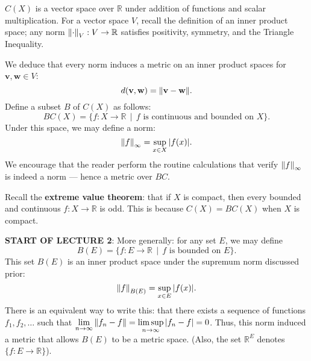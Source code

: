 \documentclass[11pt]{article}
\renewcommand{\vec}[1]{\mathbf{#1}}
\begin{document}
$C(X)$ is a vector space over $\mathbb{R}$ under addition of functions and scalar multiplication. For a vector space $V$, recall the definition of an inner product space; any norm $\norm{\cdot}_{V} : V \to \mathbb{R}$ satisfies positivity, symmetry, and the Triangle Inequality. 

We deduce that every norm induces a metric on an inner product spaces for $\vec{v}, \vec{w} \in V$:
\[
	d(\vec{v}, \vec{w}) = \norm{\vec{v} - \vec{w}}.
\]
Define a subset $B$ of $C(X)$ as follows:
\[
	BC(X) = \{ f : X \to \mathbb{R} \, \mid \, f \text{ is continuous and bounded on } X \}.
\]
Under this space, we may define a norm:
\[
	\norm{f}_{\infty} = \sup\limits_{x \in X} \abs{f(x)}.
\]
We encourage that the reader perform the routine calculations that verify $\norm{f}_{\infty}$ is indeed a norm --- hence a metric over $BC$.

Recall the \textbf{extreme value theorem}: that if $X$ is compact, then every bounded and continuous $f : X \to \mathbb{R}$ is odd. This is because $C(X) = BC(X)$ when $X$ is compact. 

\textbf{START OF LECTURE 2}: More generally: for any set $E$, we may define
\[
	B(E) = \{ f : E \to \mathbb{R} \, \mid \, f \text{ is bounded on $E$}\}.
\]
This set $B(E)$ is an inner product space under the supremum norm discussed prior:
\[
	\norm{f}_{B(E)} = \sup\limits_{x \in E} \abs{f(x)}.
\]
There is an equivalent way to write this: that there exists a sequence of functions $f_{1}, f_{2}, \ldots$ such that $\lim\limits_{n \to \infty} \norm{f_{n} - f} = \limsup\limits_{n \to \infty} \abs{f_{n} - f} = 0$. Thus, this norm induced a metric that allows $B(E)$ to be a metric space. (Also, the set $\mathbb{R}^{E}$ denotes $\{ f : E \to \mathbb{R} \}$). 
\end{document}
